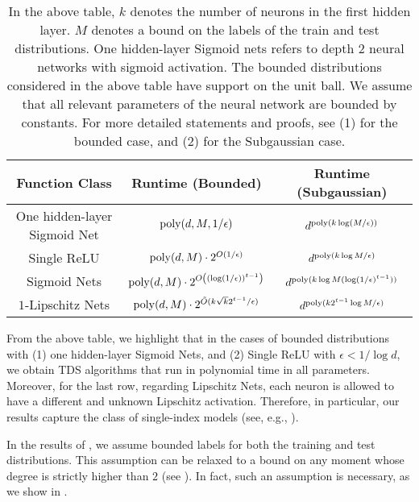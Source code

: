 \documentclass[11pt]{article} %
\numberwithin{equation}{section}
\begin{document}
\renewcommand{\arraystretch}{2}
\begin{table}[ht]
\centering
\begin{tabular}{|c|c|c|}
\hline
Function Class &  Runtime (Bounded) & Runtime (Subgaussian)\\
\hline
\hline
One hidden-layer Sigmoid Net & $\mathrm{poly}(d,M,1/\epsilon)$& $d^{ \mathrm{poly}(k\log(M/\epsilon))}$\\
\hline
Single ReLU & $\mathrm{poly}(d,M)\cdot 2^{O(1/\epsilon)}$& $d^{ \mathrm{poly}(k\log M/\epsilon)}$\\
\hline
Sigmoid Nets &$\mathrm{poly}(d,M) \cdot 2^{O\left((\log(1/\epsilon))^{t-1}\right)}$& $d^{ \mathrm{poly}(k\log M(\log(1/\epsilon)^{t-1}))}$\\
\hline
$1$-Lipschitz Nets & $\mathrm{poly}(d,M) \cdot 2^{\tilde{O}(k\sqrt{k}2^{t-1}/\epsilon)}$& $d^{\mathrm{poly}(k2^{t-1}\log M/\epsilon)}$\\
\hline
\end{tabular}
\caption{In the above table, $k$ denotes the number of neurons in the first hidden layer. $M$ denotes a bound on the labels of the train and test distributions. One hidden-layer Sigmoid nets refers to depth $2$ neural networks with sigmoid activation. The bounded distributions considered in the above table have support on the unit ball. We assume that all relevant parameters of the neural network are bounded by constants. For more detailed statements and proofs, see (1)   for the bounded case, and (2)  for the Subgaussian case.} \label{table:main-results}
\end{table}

From the above table, we highlight that in the cases of bounded distributions with (1) one hidden-layer Sigmoid Nets, and (2) Single ReLU with $\epsilon<1/\log d$, we obtain TDS algorithms that run in polynomial time in all parameters. Moreover, for the last row, regarding Lipschitz Nets, each neuron is allowed to have a different and unknown Lipschitz activation. Therefore, in particular, our results capture the class of single-index models (see, e.g., \cite{glmtron,gollakota2024agnostically}).

In the results of , we assume bounded labels for both the training and test distributions. This assumption can be relaxed to a bound on any moment whose degree is strictly higher than $2$ (see ). In fact, such an assumption is necessary, as we show in .
\end{document}

